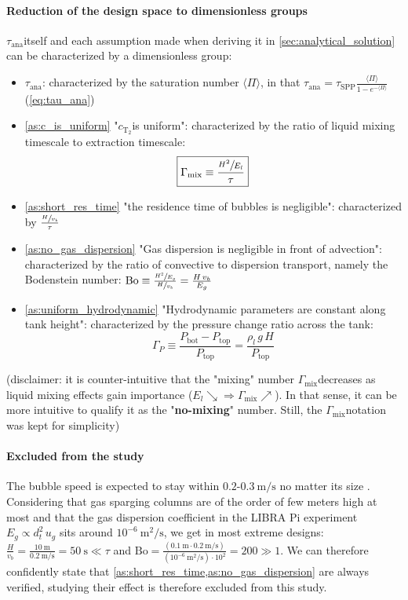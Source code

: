 \documentclass[a4paper,11pt,oneside]{report}
\newcommand{\CT}{\ensuremath{c_\mathrm{T_2}}}
\newcommand{\Tana}{\ensuremath{\tau_\mathrm{ana}}}
\newcommand{\Gmix}{\ensuremath{\Gamma_\mathrm{mix}}}
\newcommand{\Gp}{\ensuremath{\Gamma_P}}
\newcommand{\PI}{\ensuremath{\langle \Pi \rangle}}
\newcounter{assumption}[chapter]
\begin{document}
\paragraph{Reduction of the design space to dimensionless groups}

\Tana itself and each assumption made when deriving it in \cref{sec:analytical_solution} can be characterized by a dimensionless group:
\begin{itemize}
    \item \Tana: characterized by the saturation number \PI, in that $\Tana=\tau_\mathrm{SPP}\frac{\PI}{1-e^{-\PI}}$ (\cref{eq:tau_ana})
    \item \cref{as:c_is_uniform} "\CT is uniform": characterized by the ratio of liquid mixing timescale to extraction timescale: 
    \begin{equation}
        \boxed{\Gmix\equiv\frac{\sfrac{H^2}{E_l}}{\tau}}
    \end{equation}
    \item \cref{as:short_res_time} "the residence time of bubbles is negligible": characterized by $\frac{\sfrac{H}{v_b}}{\tau}$
    \item \cref{as:no_gas_dispersion} "Gas dispersion is negligible in front of advection": characterized by the ratio of convective to dispersion transport, namely the Bodenstein number: $\mathrm{Bo}\equiv \frac{\sfrac{H^2}{E_g}}{\sfrac{H}{v_b}}=\frac{H\,v_b}{E_g}$
    \item \cref{as:uniform_hydrodynamic} "Hydrodynamic parameters are constant along tank height": characterized by the pressure change ratio across the tank: 
    \begin{equation}
        \boxed{\Gp \equiv \frac{P_\mathrm{bot}-P_\mathrm{top}}{P_\mathrm{top}}=\frac{\rho_l\,g\,H}{P_\mathrm{top}}}
    \end{equation}
\end{itemize}

(disclaimer: it is counter-intuitive that the "mixing" number \Gmix decreases as liquid mixing effects gain importance ($E_l\searrow\Rightarrow\Gmix\nearrow$). In that sense, it can be more intuitive to qualify it as the "\textbf{no-mixing}" number. Still, the \Gmix notation was kept for simplicity)

\paragraph{Excluded from the study}
The bubble speed is expected to stay within $0.2$-$0.3\ \mathrm{m/s}$ no matter its size \cite{chavez_experimental_2021}. Considering that gas sparging columns are of the order of few meters high at most and that the gas dispersion coefficient in the LIBRA Pi experiment $E_g\propto d_t^2\,u_g$ sits around $10^{-6}\ \mathrm{m^2/s}$, we get in most extreme designs: $\frac{H}{v_b}=\frac{10\ \mathrm{m}}{0.2 \ \mathrm{m/s}}=50\ \mathrm{s}\ll \tau$ and $\mathrm{Bo}=\frac{(0.1 \ \mathrm{m}\cdot 0.2 \ \mathrm{m/s})}{(10^{-6} \ \mathrm{m^2/s})\cdot 10^{2}}=200\gg 1$. We can therefore confidently state that \cref{as:short_res_time,as:no_gas_dispersion} are always verified, studying their effect is therefore excluded from this study. 
\end{document}
